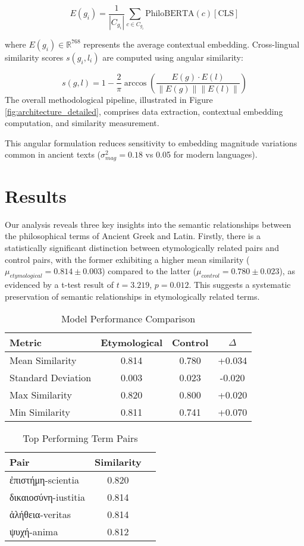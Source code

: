 \documentclass[11pt]{article} %
\begin{document}
\begin{equation}
E(g_i) = \frac{1}{|C_{g_i}|}\sum_{c \in C_{g_i}} \text{PhiloBERTA}(c)[\text{CLS}]
\end{equation}

where $E(g_i) \in \mathbb{R}^{768}$ represents the average contextual embedding. Cross-lingual similarity scores $s(g_i,l_i)$ are computed using angular similarity:

\begin{equation}
s(g,l) = 1 - \frac{2}{\pi}\arccos\left(\frac{E(g) \cdot E(l)}{\|E(g)\|\|E(l)\|}\right)
\end{equation}
\noindent The overall methodological pipeline, illustrated in Figure \ref{fig:architecture_detailed}, comprises data extraction, contextual embedding computation, and similarity measurement.

This angular formulation reduces sensitivity to embedding magnitude variations common in ancient texts ($\sigma^2_{mag} = 0.18$ vs 0.05 for modern languages).

\section{Results}
Our analysis reveals three key insights into the semantic relationships between the philosophical terms of Ancient Greek and Latin. Firstly, there is a statistically significant distinction between etymologically related pairs and control pairs, with the former exhibiting a higher mean similarity ($\mu_{etymological} = 0.814 \pm 0.003$) compared to the latter ($\mu_{control} = 0.780 \pm 0.023$), as evidenced by a t-test result of $t=3.219$, $p=0.012$. This suggests a systematic preservation of semantic relationships in etymologically related terms.

\begin{table}[!htb]
\centering
\caption{Model Performance Comparison}
\begin{tabular}{lccc}
Metric & Etymological & Control & $\Delta$ \\
\hline
Mean Similarity & 0.814 & 0.780 & +0.034 \\
Standard Deviation & 0.003 & 0.023 & -0.020 \\
Max Similarity & 0.820 & 0.800 & +0.020 \\
Min Similarity & 0.811 & 0.741 & +0.070 \\
\end{tabular}
\end{table}

\begin{table}[htbp]
\centering
\caption{Top Performing Term Pairs}
\begin{tabular}{lcc}
Pair & Similarity \\
\hline
\textgreek{ἐπιστήμη}-scientia & 0.820 \\
\textgreek{δικαιοσύνη}-iustitia & 0.814 \\
\textgreek{ἀλήθεια}-veritas & 0.814  \\
\textgreek{ψυχή}-anima & 0.812 \\
\end{tabular}
\end{table}
\end{document}
